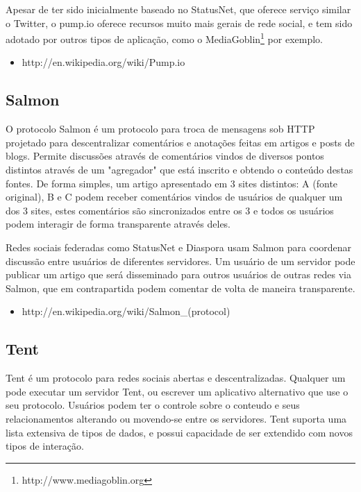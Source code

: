 \documentclass[12pt]{article}
\begin{document}
Apesar de ter sido inicialmente baseado no StatusNet, que oferece serviço
similar o Twitter, o pump.io oferece recursos muito mais gerais de rede
social, e tem sido adotado por outros tipos de aplicação, como o
MediaGoblin\footnote{http://www.mediagoblin.org} por exemplo.

\begin{itemize}
  \item http://en.wikipedia.org/wiki/Pump.io
\end{itemize}

\subsection{Salmon}

O protocolo Salmon é um protocolo para troca de mensagens sob HTTP projetado
para descentralizar comentários e anotações feitas em artigos e posts de
blogs. Permite discussões através de comentários vindos de diversos pontos
distintos através de um "agregador" que está inscrito e obtendo o conteúdo
destas fontes. De forma simples, um artigo apresentado em 3 sites distintos: A
(fonte original), B e C podem receber comentários vindos de usuários de
qualquer um dos 3 sites, estes comentários são sincronizados entre os 3
e todos os usuários podem interagir de forma transparente através deles.

Redes sociais federadas como StatusNet e Diaspora usam Salmon para coordenar
discussão entre usuários de diferentes servidores. Um usuário de um servidor
pode publicar um artigo que será disseminado para outros usuários de outras
redes via Salmon, que em contrapartida podem comentar de volta de maneira
transparente.

\begin{itemize}
  \item http://en.wikipedia.org/wiki/Salmon\_(protocol)
\end{itemize}

\subsection{Tent}

Tent é um protocolo para redes sociais abertas e descentralizadas.  Qualquer
um pode executar um servidor Tent, ou escrever um aplicativo alternativo que
use o seu protocolo. Usuários podem ter o controle sobre o conteudo e seus
relacionamentos alterando ou movendo-se entre os servidores. Tent suporta uma
lista extensiva de tipos de dados, e possui capacidade de ser extendido com
novos tipos de interação.
\end{document}
